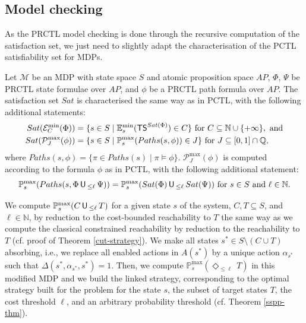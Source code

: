 \subsection*{Model checking}

As the PRCTL model checking is done
through the recursive computation of the satisfaction set, we just need to slightly adapt the characterisation of the PCTL satisfiability set for MDPs.
\begin{property}
  Let \sloppy$\mathcal{M}$ be an MDP with state space $S$ and atomic proposition space $AP$, $\Phi$, $\Psi$ be PRCTL state formulae over $AP$, and $\phi$ be a PRCTL path formula over $AP$. The satisfaction set $Sat$ is characterised the same way as in PCTL, with the following additional statements:
  \begin{align*}
    Sat(\mathcal{E}^{\min}_C(\Phi)) &= \{ s \in S \; | \; \mathbb{E}^{\min}_s(\text{\sffamily TS}^{Sat(\Phi)}) \in C \} \text{ for } C \subseteq \mathbb{N} \cup \{+\infty\}, \text{ and} \\
    Sat(\mathcal{P}^{\max}_J(\phi)) &= \{ s \in S \; | \; \mathbb{P}^{\max}_s (Paths(s, \phi)) \in J \} \text{ for } J \subseteq [0, 1] \cap \mathbb{Q},
  \end{align*}
    where $Paths(s, \phi) = \{ \pi \in Paths(s) \; | \; \pi \models \phi \}$.
    $\mathcal{P}^{\max}_J(\phi)$ is computed according to the formula $\phi$ as in PCTL, with the following additional statement:
  \[
    \mathbb{P}^{\max}_s(Paths(s, \Phi \,\text{\sffamily U}\,_{\leq \ell}\, \Psi)) = \mathbb{P}^{\max}_s(Sat(\Phi) \,\text{\sffamily U}\,_{\leq \ell} \, Sat(\Psi)) \text{ for } s \in S \text{ and } \ell \in \mathbb{N}.
  \]
\end{property}

We compute $\mathbb{P}_s^{\max}(C \,\text{\sffamily U}\,_{\leq \ell} \, T)$ for a given state $s$ of the system, $C, T \subseteq S$, and $\ell \in \mathbb{N}$, by reduction to the cost-bounded reachability to $T$ the same way as we compute the classical constrained reachability by reduction to the reachability to $T$ (cf. proof of Theorem \ref{cut-strategy}).
We make all states $s^* \in S \setminus (C \cup T)$ absorbing, i.e., we replace all enabled actions in $A(s^*)$
by a unique action $\alpha_{s^*}$ such that $\Delta(s^*, \alpha_{s^*}, s^*) = 1$.
Then, we compute $\mathbb{P}^{\max}_s(\Diamond_{\leq \ell}\, T)$ in this modified MDP and we build the linked strategy, corresponding to the optimal strategy built for the \SSPP{} problem for the state $s$, the subset of target states $T$, the cost threshold $\ell$, and an arbitrary probability threshold (cf. Theorem \ref{sspp-thm}).

